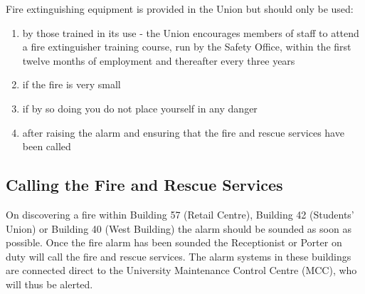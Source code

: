 \documentclass[12pt,a4paper]{scrartcl}
\begin{document}
Fire extinguishing equipment is provided in the Union but should only be used: 
\begin{enumerate}
\item by those trained in its use - the Union encourages members of staff to attend a fire extinguisher training course, run by the Safety Office, within the first twelve months of employment and thereafter every three years
\item if the fire is very small 
\item if by so doing you do not place yourself in any danger 
\item after raising the alarm and ensuring that the fire and rescue services have been called 
\end{enumerate}

               
\subsection{Calling the Fire and Rescue Services}
On discovering a fire within Building 57 (Retail Centre), Building 42 (Students’ Union) or 
Building 40 (West Building) the alarm should be sounded as soon as possible. Once the 
fire alarm has been sounded the Receptionist or Porter on duty will call the fire and 
rescue services. The alarm systems in these buildings are connected direct to the 
University Maintenance Control Centre (MCC), who will thus be alerted. 
\end{document}
